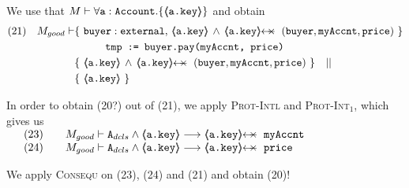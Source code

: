 \begin{proofO}
We use that $M \vdash \forall {\mbox{\normalfont{\texttt{a}}}:\mbox{\normalfont{\texttt{Account}}}}.{{\{}}{\langle\!\!\langle \mbox{\normalfont{\texttt{a.key}}} \rangle\!\!\rangle}{{\}}}$
 and  obtain
 \\
 \small
\begin{align*}
\text{(21)} \ \ \ M_{good} \vdash & \{ \ \prg{buyer}:\prg{external},\,  {\inside{\prg{a.key}}} \, \wedge\, 
\protectedFrom {\prg{a.key}} {(\prg{buyer},\prg{myAccnt},\prg{price})} \  \} \\
		  		& \SPT  \prg{tmp := buyer.pay(myAccnt, price)}\ \\  
		  		& \{ \ \inside{\prg{a.key}} \, \wedge\, 
\protectedFrom {\prg{a.key}} {(\prg{buyer},\prg{myAccnt},\prg{price})}\ \} \ \ \  || \ \ \  \\
		  		&   \{ \   {\inside{\prg{a.key}}}\  \}
\end{align*}
\normalsize 
 
In order to obtain (20?) out of (21), we apply \textsc{Prot-Intl} and \textsc{Prot-Int}$_1$,   which gives us\\
$
\begin{array}{llll}
& (23) & & M_{good} \vdash \Alocals \wedge  {\inside{\prg{a.key}}}  \longrightarrow \protectedFrom {\prg{a.key}} {\prg{myAccnt}} 
\\
& (24) & & M_{good} \vdash \Alocals \wedge  {\inside{\prg{a.key}}}  \longrightarrow \protectedFrom {\prg{a.key}} {\prg{price}} 
\end{array}
$

We apply {\textsc{Consequ}} on (23), (24) and (21) and obtain (20)!

\normalsize






\end{proofO}
